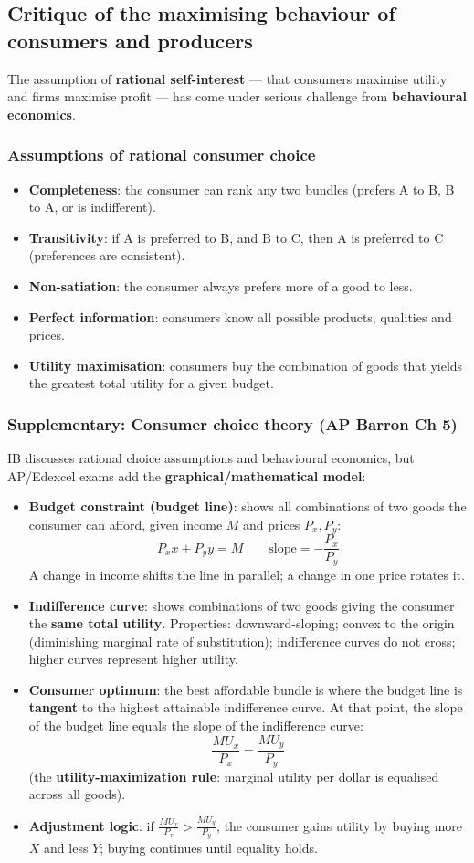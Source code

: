 \documentclass[a4paper,12pt]{article}
\newcommand{\needbold}[1]{\textcolor{red!70!black}{\textbf{#1}}}
\begin{document}
\subsection{Critique of the maximising behaviour of consumers and producers}
The assumption of \textbf{rational self-interest} --- that consumers maximise utility and firms maximise profit --- has come under serious challenge from \textbf{behavioural economics}.
\subsubsection*{Assumptions of rational consumer choice}
\begin{itemize}
  \item \textbf{Completeness}: the consumer can rank any two bundles (prefers A to B, B to A, or is indifferent).
  \item \textbf{Transitivity}: if A is preferred to B, and B to C, then A is preferred to C (preferences are consistent).
  \item \textbf{Non-satiation}: the consumer always prefers more of a good to less.
  \item \textbf{Perfect information}: consumers know all possible products, qualities and prices.
  \item \textbf{Utility maximisation}: consumers buy the combination of goods that yields the greatest total utility for a given budget.
\end{itemize}
\subsubsection*{Supplementary: Consumer choice theory (AP Barron Ch 5)}
IB discusses rational choice assumptions and behavioural economics, but AP/Edexcel exams add the \textbf{graphical/mathematical model}:
\begin{itemize}
  \item \needbold{Budget constraint (budget line)}: shows all combinations of two goods the consumer can afford, given income $M$ and prices $P_x, P_y$:
  \[P_x x + P_y y = M \qquad \text{slope} = -\dfrac{P_x}{P_y}\]
  A change in income shifts the line in parallel; a change in one price rotates it.
  \item \needbold{Indifference curve}: shows combinations of two goods giving the consumer the \textbf{same total utility}. Properties: downward-sloping; convex to the origin (diminishing marginal rate of substitution); indifference curves do not cross; higher curves represent higher utility.
  \item \needbold{Consumer optimum}: the best affordable bundle is where the budget line is \textbf{tangent} to the highest attainable indifference curve. At that point, the slope of the budget line equals the slope of the indifference curve:
  \[\dfrac{MU_x}{P_x}=\dfrac{MU_y}{P_y}\]
  (the \needbold{utility-maximization rule}: marginal utility per dollar is equalised across all goods).
  \item \textbf{Adjustment logic}: if $\frac{MU_x}{P_x} > \frac{MU_y}{P_y}$, the consumer gains utility by buying more $X$ and less $Y$; buying continues until equality holds.
\end{itemize}
\end{document}
